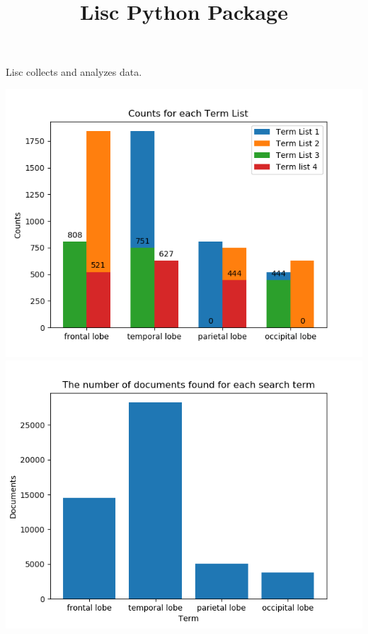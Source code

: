 \documentclass[]{article}
\title{Lisc Python Package}
\begin{document}
\maketitle

Lisc collects and analyzes data.

\includegraphics{counts}
\includegraphics{document}
\end{document}

